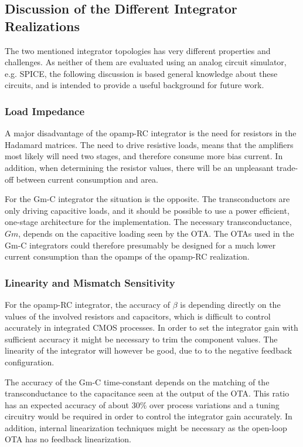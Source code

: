 \subsection{Discussion of the Different Integrator Realizations}
The two mentioned integrator topologies has very different properties and challenges. As neither of them are evaluated using an analog circuit simulator, e.g. SPICE, the following discussion is based general knowledge about these circuits, and is intended to provide a useful background for future work.


\subsubsection*{Load Impedance}
A major disadvantage of the opamp-RC integrator is the need for resistors in the Hadamard matrices. The need to drive resistive loads, means that the amplifiers most likely will need two stages, and therefore consume more bias current. In addition, when determining the resistor values, there will be an unpleasant trade-off between current consumption and area.

For the Gm-C integrator the situation is the opposite. The transconductors are only driving capacitive loads, and it should be possible to use a power efficient, one-stage architecture for the implementation. The necessary transconductance, $Gm$, depends on the capacitive loading seen by the OTA. The OTAs used in the Gm-C integrators could therefore presumably be designed for a much lower current consumption than the opamps of the opamp-RC realization.

\subsubsection*{Linearity and Mismatch Sensitivity}
For the opamp-RC integrator, the accuracy of $\beta$ is depending directly on the values of the involved resistors and capacitors, which is difficult to control accurately in integrated CMOS processes. In order to set the integrator gain with sufficient accuracy it might be necessary to trim the component values. The linearity of the integrator will however be good, due to to the negative feedback configuration.

The accuracy of the Gm-C time-constant depends on the matching of the transconductance to the capacitance seen at the output of the OTA. This ratio has an expected accuracy of about 30\% over process variations \cite{johns_martin} and a tuning circuitry would be required in order to control the integrator gain accurately. In addition, internal linearization techniques might be necessary as the open-loop OTA has no feedback linearization.

